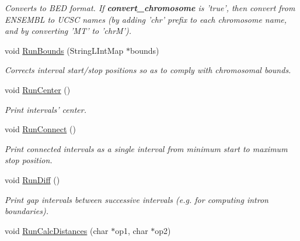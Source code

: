 \begin{CompactItemize}
\begin{CompactList}\small\item\em Converts to BED format. If {\bf convert\_\-chromosome} is 'true', then convert from ENSEMBL to UCSC names (by adding 'chr' prefix to each chromosome name, and by converting 'MT' to 'chrM'). \item\end{CompactList}\item 
\hypertarget{classGenomicRegionSet_d7ad039dd702837f37c2cdfebd9b2845}{
void \hyperlink{classGenomicRegionSet_d7ad039dd702837f37c2cdfebd9b2845}{RunBounds} (StringLIntMap $\ast$bounds)}
\label{classGenomicRegionSet_d7ad039dd702837f37c2cdfebd9b2845}

\begin{CompactList}\small\item\em Corrects interval start/stop positions so as to comply with chromosomal bounds. \item\end{CompactList}\item 
\hypertarget{classGenomicRegionSet_1aa8f41f0978e9b66c6f11c0ccb95a0b}{
void \hyperlink{classGenomicRegionSet_1aa8f41f0978e9b66c6f11c0ccb95a0b}{RunCenter} ()}
\label{classGenomicRegionSet_1aa8f41f0978e9b66c6f11c0ccb95a0b}

\begin{CompactList}\small\item\em Print intervals' center. \item\end{CompactList}\item 
\hypertarget{classGenomicRegionSet_752b7d4d2ac3568e7bdb13edbfc00af3}{
void \hyperlink{classGenomicRegionSet_752b7d4d2ac3568e7bdb13edbfc00af3}{RunConnect} ()}
\label{classGenomicRegionSet_752b7d4d2ac3568e7bdb13edbfc00af3}

\begin{CompactList}\small\item\em Print connected intervals as a single interval from minimum start to maximum stop position. \item\end{CompactList}\item 
\hypertarget{classGenomicRegionSet_90256738bd85501460874ab8e69b894b}{
void \hyperlink{classGenomicRegionSet_90256738bd85501460874ab8e69b894b}{RunDiff} ()}
\label{classGenomicRegionSet_90256738bd85501460874ab8e69b894b}

\begin{CompactList}\small\item\em Print gap intervals between successive intervals (e.g. for computing intron boundaries). \item\end{CompactList}\item 
\hypertarget{classGenomicRegionSet_22f3fce9421a0f80c96ec0a9346fec19}{
void \hyperlink{classGenomicRegionSet_22f3fce9421a0f80c96ec0a9346fec19}{RunCalcDistances} (char $\ast$op1, char $\ast$op2)}
\label{classGenomicRegionSet_22f3fce9421a0f80c96ec0a9346fec19}


\end{CompactItemize}
